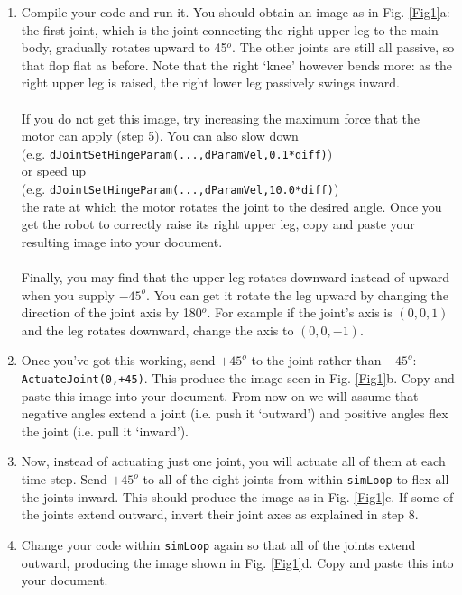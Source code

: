 \documentclass[12pt]{article}
\begin{document}
\begin{enumerate}
\item Compile your code and run it. You should obtain an image as in Fig. \ref{Fig1}a: the first joint, which is the joint connecting the right upper leg to the main body, gradually rotates upward to 45$^o$. The other joints are still all passive, so that flop flat as before. Note that the right `knee' however bends more: as the right upper leg is raised, the right lower leg passively swings inward. \\ \\
    If you do not get this image, try increasing the maximum force that the motor can apply (step 5). You can also slow down \\
    (e.g. \texttt{dJointSetHingeParam(...,dParamVel,0.1*diff)}) \\
    or speed up \\
    (e.g. \texttt{dJointSetHingeParam(...,dParamVel,10.0*diff)}) \\
    the rate at which the motor rotates the joint to the desired angle. Once you get the robot to correctly raise its right upper leg, copy and paste your resulting image into your document. \\ \\
    Finally, you may find that the upper leg rotates downward instead of upward when you supply $-45^o$. You can get it rotate the leg upward by changing the direction of the joint axis by 180$^o$. For example if the joint's axis is $(0,0,1)$ and the leg rotates downward, change the axis to $(0,0,-1)$.

\item Once you've got this working, send $+45^o$ to the joint rather than $-45^o$: \\
    \texttt{ActuateJoint(0,+45)}. This produce the image seen in Fig. \ref{Fig1}b. Copy and paste this image into your document. From now on we will assume that negative angles extend a joint (i.e. push it `outward') and positive angles flex the joint (i.e. pull it `inward').

\item Now, instead of actuating just one joint, you will actuate all of them at each time step. Send $+45^o$ to all of the eight joints from within \texttt{simLoop} to flex all the joints inward. This should produce the image as in Fig. \ref{Fig1}c. If some of the joints extend outward, invert their joint axes as explained in step 8.

\item Change your code within \texttt{simLoop} again so that all of the joints extend outward, producing the image shown in Fig. \ref{Fig1}d. Copy and paste this into your document.


\end{enumerate}
\end{document}
